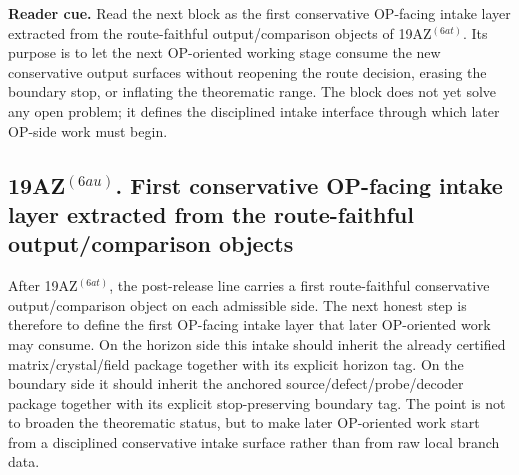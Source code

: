 \noindent\textbf{Reader cue.} Read the next block as the first conservative OP-facing intake layer extracted from the route-faithful output/comparison objects of 19AZ$^{(6at)}$. Its purpose is to let the next OP-oriented working stage consume the new conservative output surfaces without reopening the route decision, erasing the boundary stop, or inflating the theorematic range. The block does not yet solve any open problem; it defines the disciplined intake interface through which later OP-side work must begin.

\subsection*{19AZ$^{(6au)}$. First conservative OP-facing intake layer extracted from the route-faithful output/comparison objects}
\label{sec:first-conservative-op-facing-intake-layer-extracted-from-the-route-faithful-output-comparison-objects}
After 19AZ$^{(6at)}$, the post-release line carries a first route-faithful conservative output/comparison object on each admissible side. The next honest step is therefore to define the first OP-facing intake layer that later OP-oriented work may consume. On the horizon side this intake should inherit the already certified matrix/crystal/field package together with its explicit horizon tag. On the boundary side it should inherit the anchored source/defect/probe/decoder package together with its explicit stop-preserving boundary tag. The point is not to broaden the theorematic status, but to make later OP-oriented work start from a disciplined conservative intake surface rather than from raw local branch data.

